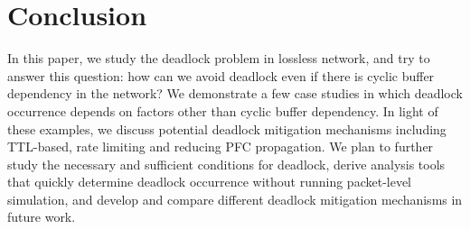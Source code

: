 \secspace
\section{Conclusion}
\secspace

In this paper, we study the deadlock problem in lossless network, and try to answer
this question: how can we avoid deadlock even if there is cyclic buffer dependency in
the network? We demonstrate a few case studies in which deadlock occurrence depends on
factors other than cyclic buffer dependency. In light of these examples, we discuss 
potential deadlock mitigation mechanisms including TTL-based, rate limiting and reducing
PFC propagation. We plan to further study the 
necessary and sufficient conditions for deadlock, derive analysis tools that quickly determine
deadlock occurrence without running packet-level simulation, and develop and compare
different deadlock mitigation mechanisms in future work.

